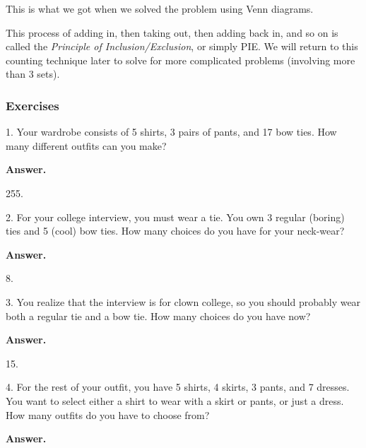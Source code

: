 \documentclass[10pt,]{book}
\theoremstyle{plain}
\theoremstyle{definition}
\theoremstyle{definition}
\theoremstyle{definition}
\numberwithin{equation}{section}
\begin{document}
This is what we got when we solved the problem using Venn diagrams.
%
\par

This process of adding in, then taking out, then adding back in, and so on is called the \emph{Principle of Inclusion/Exclusion}, or simply PIE. We will return to this counting technique later to solve for more complicated problems (involving more than 3 sets).
%
\typeout{************************************************}
\typeout{************************************************}
\subsubsection[Exercises]{Exercises}\label{exercises-3}
\begin{exerciselist}
\item[1.]\hypertarget{exercise-32}{}
Your wardrobe consists of 5 shirts, 3 pairs of pants, and 17 bow ties. How many different outfits can you make?
%
\par\smallskip
\par\smallskip
\noindent\textbf{Answer.}\hypertarget{answer-32}{}\quad

255.
%
\item[2.]\hypertarget{exercise-33}{}
For your college interview, you must wear a tie. You own 3 regular (boring) ties and 5 (cool) bow ties. How many choices do you have for your neck-wear?
%
\par\smallskip
\par\smallskip
\noindent\textbf{Answer.}\hypertarget{answer-33}{}\quad

8.
%
\item[3.]\hypertarget{exercise-34}{}
You realize that the interview is for clown college, so you should probably wear both a regular tie and a bow tie. How many choices do you have now?
%
\par\smallskip
\par\smallskip
\noindent\textbf{Answer.}\hypertarget{answer-34}{}\quad

15.
%
\item[4.]\hypertarget{exercise-35}{}
For the rest of your outfit, you have 5 shirts, 4 skirts, 3 pants, and 7 dresses. You want to select either a shirt to wear with a skirt or pants, or just a dress. How many outfits do you have to choose from?
%
\par\smallskip
\par\smallskip
\noindent\textbf{Answer.}\hypertarget{answer-35}{}\quad


\end{exerciselist}
\end{document}
